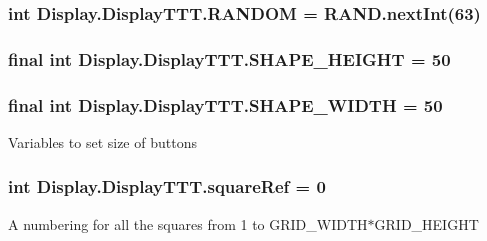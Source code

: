 \subsubsection[{R\+A\+N\+D\+O\+M}]{\setlength{\rightskip}{0pt plus 5cm}int Display.\+Display\+T\+T\+T.\+R\+A\+N\+D\+O\+M = R\+A\+N\+D.\+next\+Int(63)\hspace{0.3cm}{\ttfamily [private]}}\label{class_display_1_1_display_t_t_t_a30415017d1d80126ca6295a1d711684d}
\hypertarget{class_display_1_1_display_t_t_t_ad7c69ef4532bf358596b4a2d09c22fbc}{}
\subsubsection[{S\+H\+A\+P\+E\+\_\+\+H\+E\+I\+G\+H\+T}]{\setlength{\rightskip}{0pt plus 5cm}final int Display.\+Display\+T\+T\+T.\+S\+H\+A\+P\+E\+\_\+\+H\+E\+I\+G\+H\+T = 50}\label{class_display_1_1_display_t_t_t_ad7c69ef4532bf358596b4a2d09c22fbc}
\hypertarget{class_display_1_1_display_t_t_t_aba4c92bd721d0fb8718fbf9ed9d837e4}{}
\subsubsection[{S\+H\+A\+P\+E\+\_\+\+W\+I\+D\+T\+H}]{\setlength{\rightskip}{0pt plus 5cm}final int Display.\+Display\+T\+T\+T.\+S\+H\+A\+P\+E\+\_\+\+W\+I\+D\+T\+H = 50}\label{class_display_1_1_display_t_t_t_aba4c92bd721d0fb8718fbf9ed9d837e4}
Variables to set size of buttons \hypertarget{class_display_1_1_display_t_t_t_a72b67bc50aa6ba47ae9d398e597c49bb}{}
\subsubsection[{square\+Ref}]{\setlength{\rightskip}{0pt plus 5cm}int Display.\+Display\+T\+T\+T.\+square\+Ref = 0\hspace{0.3cm}{\ttfamily [private]}}\label{class_display_1_1_display_t_t_t_a72b67bc50aa6ba47ae9d398e597c49bb}
A numbering for all the squares from 1 to G\+R\+I\+D\+\_\+\+W\+I\+D\+T\+H$\ast$\+G\+R\+I\+D\+\_\+\+H\+E\+I\+G\+H\+T \hypertarget{class_display_1_1_display_t_t_t_a7dc4fccda99b958bd1dead1dc6543442}{}
